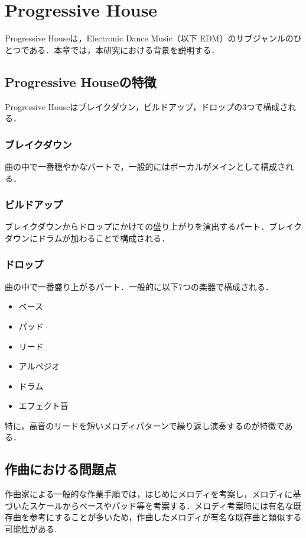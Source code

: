 \chapter{Progressive House}
Progressive Houseは，Electronic Dance Music（以下 EDM）のサブジャンルのひとつである．本章では，本研究における背景を説明する．

\section{Progressive Houseの特徴}
Progressive Houseはブレイクダウン，ビルドアップ，ドロップの3つで構成される．
\subsection{ブレイクダウン}
曲の中で一番穏やかなバートで，一般的にはボーカルがメインとして構成される．

\subsection{ビルドアップ}
ブレイクダウンからドロップにかけての盛り上がりを演出するパート．ブレイクダウンにドラムが加わることで構成される．

\subsection{ドロップ}
曲の中で一番盛り上がるパート．一般的に以下7つの楽器で構成される．

\begin{itemize}
  \item ベース
  \item パッド
  \item リード
  \item アルペジオ
  \item ドラム
  \item エフェクト音
\end{itemize}

特に，高音のリードを短いメロディパターンで繰り返し演奏するのが特徴である．

\section{作曲における問題点}
作曲家による一般的な作業手順では，はじめにメロディを考案し，メロディに基づいたスケールからベースやパッド等を考案する．メロディ考案時には有名な既存曲を参考にすることが多いため，作曲したメロディが有名な既存曲と類似する可能性がある.

